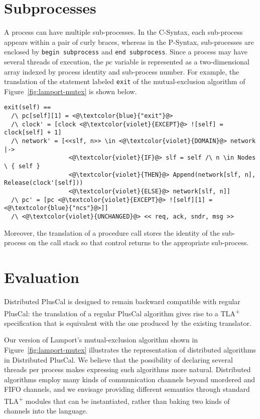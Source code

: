 \documentclass{article}
\newcommand{\tlaplus}{TLA\textsuperscript{+}\xspace}
\begin{document}
\section{Subprocesses}

A process can have multiple sub-processes.
In the C-Syntax, each sub-process appears within a pair of curly braces, whereas in the P-Syntax, sub-processes are enclosed by \verb|begin subprocess| and \verb|end subprocess|. Since a process may have several threads of execution, the $pc$ variable is represented as a two-dimensional array indexed by process identity and sub-process number. For example, the translation of the statement labeled \verb|exit| of the mutual-exclusion algorithm of Figure~\ref{fig:lamport-mutex} is shown below.

\begin{lstlisting}[language=pluscal,frame = tlrb, numbers=none]  
exit(self) == 
  /\ pc[self][1] = <@\textcolor{blue}{"exit"}@>
  /\ clock' = [clock <@\textcolor{violet}{EXCEPT}@> ![self] = clock[self] + 1]
  /\ network' = [<<slf, n>> \in <@\textcolor{violet}{DOMAIN}@> network |->  
                  <@\textcolor{violet}{IF}@> slf = self /\ n \in Nodes \ { self } 
                  <@\textcolor{violet}{THEN}@> Append(network[slf, n], Release(clock'[self])) 
                  <@\textcolor{violet}{ELSE}@> network[slf, n]]
  /\ pc' = [pc <@\textcolor{violet}{EXCEPT}@> ![self][1] = <@\textcolor{blue}{"ncs"}@>]]
  /\ <@\textcolor{violet}{UNCHANGED}@> << req, ack, sndr, msg >>
\end{lstlisting}

Moreover, the translation of a procedure call stores the identity of the sub-process on the call stack so that control returns to the appropriate sub-process.


\section{Evaluation}

Distributed PlusCal is designed to remain backward compatible with regular PlusCal: the translation of a regular PlusCal algorithm gives rise to a \tlaplus specification that is equivalent with the one produced by the existing translator.

Our version of Lamport's mutual-exclusion algorithm shown in Figure~\ref{fig:lamport-mutex} illustrates the representation of distributed algorithms in Distributed PlusCal. We believe that the possibility of declaring several threads per process makes expressing such algorithms more natural. Distributed algorithms employ many kinds of communication channels beyond unordered and FIFO channels, and we envisage providing different semantics through standard \tlaplus modules that can be instantiated, rather than baking two kinds of channels into the language.
\end{document}
